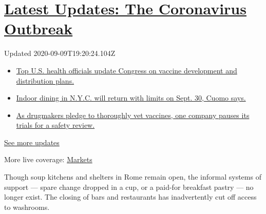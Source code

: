 \hypertarget{latest-updates-the-coronavirus-outbreak}{%
\section{\texorpdfstring{\href{https://www.nytimes3xbfgragh.onion/2020/09/09/world/covid-coronavirus.html?action=click\&pgtype=Article\&state=default\&region=MAIN_CONTENT_1\&context=storylines_live_updates}{Latest
Updates: The Coronavirus
Outbreak}}{Latest Updates: The Coronavirus Outbreak}}\label{latest-updates-the-coronavirus-outbreak}}

Updated 2020-09-09T19:20:24.104Z

\begin{itemize}
\tightlist
\item
  \href{https://www.nytimes3xbfgragh.onion/2020/09/09/world/covid-coronavirus.html?action=click\&pgtype=Article\&state=default\&region=MAIN_CONTENT_1\&context=storylines_live_updates\#link-279e24e2}{Top
  U.S. health officials update Congress on vaccine development and
  distribution plans.}
\item
  \href{https://www.nytimes3xbfgragh.onion/2020/09/09/world/covid-coronavirus.html?action=click\&pgtype=Article\&state=default\&region=MAIN_CONTENT_1\&context=storylines_live_updates\#link-792ae257}{Indoor
  dining in N.Y.C. will return with limits on Sept. 30, Cuomo says.}
\item
  \href{https://www.nytimes3xbfgragh.onion/2020/09/09/world/covid-coronavirus.html?action=click\&pgtype=Article\&state=default\&region=MAIN_CONTENT_1\&context=storylines_live_updates\#link-5b0bf0d1}{As
  drugmakers pledge to thoroughly vet vaccines, one company pauses its
  trials for a safety review.}
\end{itemize}

\href{https://www.nytimes3xbfgragh.onion/2020/09/09/world/covid-coronavirus.html?action=click\&pgtype=Article\&state=default\&region=MAIN_CONTENT_1\&context=storylines_live_updates}{See
more updates}

More live coverage:
\href{https://www.nytimes3xbfgragh.onion/live/2020/09/09/business/stock-market-today-coronavirus?action=click\&pgtype=Article\&state=default\&region=MAIN_CONTENT_1\&context=storylines_live_updates}{Markets}

Though soup kitchens and shelters in Rome remain open, the informal
systems of support --- spare change dropped in a cup, or a paid-for
breakfast pastry --- no longer exist. The closing of bars and
restaurants has inadvertently cut off access to washrooms.

